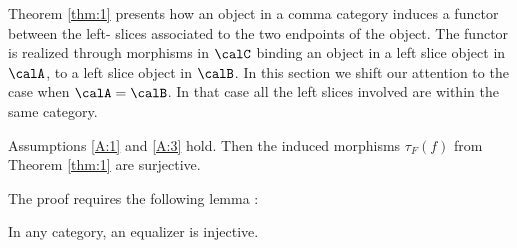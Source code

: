 \documentclass[12pt,oneside]{article}
\begin{document}
Theorem \ref{thm:1} presents how an object in a comma category induces a functor between the left- slices associated to the two endpoints of the object. The functor is realized through morphisms in $\calC$ binding an object in a left slice object in $\calA$, to a left slice object in $\calB$. In this section we shift our attention to the case when $\calA=\calB$. In that case all the  left slices involved are within the same category.



\begin{theorem} \label{thm:3}
	Assumptions \ref{A:1} and \ref{A:3} hold. Then the induced morphisms $\tau_F(f)$ from Theorem \ref{thm:1} are surjective.
\end{theorem} 

The proof requires the following lemma :

\begin{lemma} \label{lem:Eq_inj}
	In any category, an equalizer is injective.
\end{lemma}  
\end{document}
